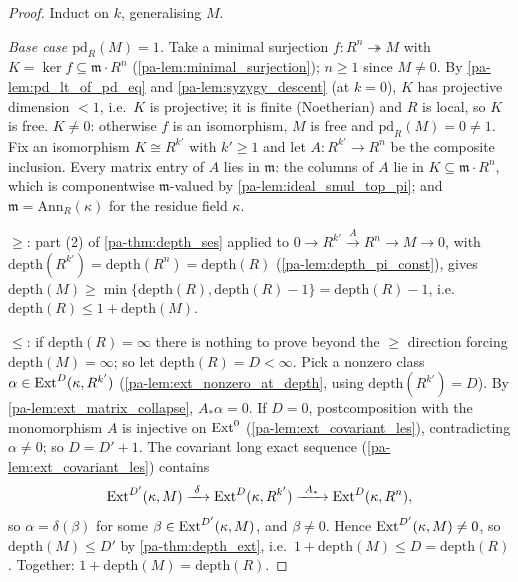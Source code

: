 \begin{proof}
  \leanok
  Induct on \(k\), generalising \(M\).

  \emph{Base case \(\mathrm{pd}_R(M) = 1\).} Take a minimal surjection
  \(f : R^n \twoheadrightarrow M\) with \(K = \ker f \subseteq \mathfrak m \cdot R^n\)
  (\ref{pa-lem:minimal_surjection}); \(n \geq 1\) since \(M \neq 0\). By
  \ref{pa-lem:pd_lt_of_pd_eq} and \ref{pa-lem:syzygy_descent} (at \(k = 0\)), \(K\) has
  projective dimension \(< 1\), i.e.\ \(K\) is projective; it is finite (Noetherian) and
  \(R\) is local, so \(K\) is free. \(K \neq 0\): otherwise \(f\) is an isomorphism,
  \(M\) is free and \(\mathrm{pd}_R(M) = 0 \neq 1\). Fix an isomorphism
  \(K \cong R^{k'}\) with \(k' \geq 1\) and let \(A : R^{k'} \to R^n\) be the composite
  inclusion. Every matrix entry of \(A\) lies in \(\mathfrak m\): the columns of \(A\)
  lie in \(K \subseteq \mathfrak m \cdot R^n\), which is componentwise
  \(\mathfrak m\)-valued by \ref{pa-lem:ideal_smul_top_pi}; and
  \(\mathfrak m = \mathrm{Ann}_R(\kappa)\) for the residue field \(\kappa\).

  \(\geq\): part (2) of \ref{pa-thm:depth_ses} applied to
  \(0 \to R^{k'} \xrightarrow{A} R^n \to M \to 0\), with
  \(\mathrm{depth}(R^{k'}) = \mathrm{depth}(R^n) = \mathrm{depth}(R)\)
  (\ref{pa-lem:depth_pi_const}), gives
  \(\mathrm{depth}(M) \geq \min\{\mathrm{depth}(R), \mathrm{depth}(R) - 1\}
  = \mathrm{depth}(R) - 1\), i.e.\
  \(\mathrm{depth}(R) \leq 1 + \mathrm{depth}(M)\).

  \(\leq\): if \(\mathrm{depth}(R) = \infty\) there is nothing to prove beyond the
  \(\geq\) direction forcing \(\mathrm{depth}(M) = \infty\); so let
  \(\mathrm{depth}(R) = D < \infty\). Pick a nonzero class
  \(\alpha \in \operatorname{Ext}^D(\kappa, R^{k'})\) (\ref{pa-lem:ext_nonzero_at_depth}, using
  \(\mathrm{depth}(R^{k'}) = D\)). By \ref{pa-lem:ext_matrix_collapse},
  \(A_*\alpha = 0\). If \(D = 0\), postcomposition with the monomorphism \(A\) is
  injective on \(\operatorname{Ext}^0\) (\ref{pa-lem:ext_covariant_les}), contradicting
  \(\alpha \neq 0\); so \(D = D' + 1\). The covariant long exact sequence
  (\ref{pa-lem:ext_covariant_les}) contains
  \[
    \operatorname{Ext}^{D'}(\kappa, M) \xrightarrow{\ \delta\ } \operatorname{Ext}^{D}(\kappa, R^{k'})
      \xrightarrow{\ A_*\ } \operatorname{Ext}^{D}(\kappa, R^n),
  \]
  so \(\alpha = \delta(\beta)\) for some \(\beta \in \operatorname{Ext}^{D'}(\kappa, M)\), and
  \(\beta \neq 0\). Hence \(\operatorname{Ext}^{D'}(\kappa, M) \neq 0\), so
  \(\mathrm{depth}(M) \leq D'\) by \ref{pa-thm:depth_ext}, i.e.\
  \(1 + \mathrm{depth}(M) \leq D = \mathrm{depth}(R)\). Together:
  \(1 + \mathrm{depth}(M) = \mathrm{depth}(R)\).


\end{proof}
